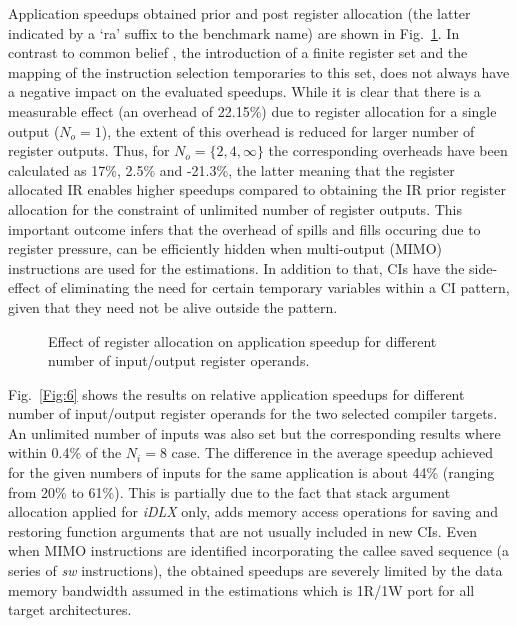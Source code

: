 \documentclass{comjnl}
\begin{document}
Application speedups obtained prior and post register allocation (the latter indicated by a `ra' suffix to the benchmark name) are shown in Fig.~\ref{Fig:5}. In contrast to common belief \cite{ClarkN03,Castro04}, the introduction of a finite register set and the mapping of the instruction selection temporaries to this set, does not always have a negative impact on the evaluated speedups. While it is clear that there is a measurable effect (an overhead of 22.15\%) due to register allocation for a single output ($N_{o}=1$), the extent of this overhead is reduced for larger number of register outputs. Thus, for $N_{o}=\{2,4,\infty\}$ the corresponding overheads have been calculated as 17\%, 2.5\% and -21.3\%, the latter meaning that the register allocated IR enables higher speedups compared to obtaining the IR prior register allocation for the constraint of unlimited number of register outputs. This important outcome infers that the overhead of spills and fills occuring due to register pressure, can be efficiently hidden when multi-output (MIMO) instructions are used for the estimations. In addition to that, CIs have the side-effect of eliminating the need for certain temporary variables within a CI pattern, given that they need not be alive outside the pattern. 

\begin{figure}[tb]
  \centering
  \caption{Effect of register allocation on application speedup for different number of input/output register operands.}
  \label{Fig:5}
  \vspace{-0.5cm}
\end{figure}

Fig.~\ref{Fig:6} shows the results on relative application speedups for different number of input/output register operands for the two selected compiler targets. An unlimited number of inputs was also set but the corresponding results where within 0.4\% of the $N_{i}=8$ case.
The difference in the average speedup achieved for the given numbers of inputs for the same application is about 44\% (ranging from 20\% to 61\%). This is partially due to the fact that stack argument allocation applied for {\it iDLX} only, adds memory access operations for saving and restoring function arguments that are not usually included in new CIs. Even when MIMO instructions are identified incorporating the callee saved sequence (a series of {\it sw} instructions), the obtained speedups are severely limited by the data memory bandwidth assumed in the estimations which is 1R/1W port for all target architectures.
\end{document}
